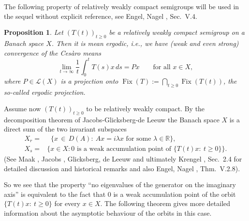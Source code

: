 \documentclass[11pt,intlimits, draft,oneside]{amsart}
\newtheorem{prop}[thm]{Proposition}
\theoremstyle{definition}
\newtheorem{defi}[thm]{Definition}
\def\Fix{\mathop{\mathrm{Fix}}}
\def\dd{\,d}
\def\clin{\mathop{\overline{\mathrm{lin}}}}
\def\LLL{\mathcal{L}}
\def\RR{\mathbb{R}}
\begin{document}
The following property of relatively weakly compact semigroups will
be used in the sequel without explicit reference, see Engel, Nagel
\cite{engel/nagel:2000}, Sec.~V.4.
%
\begin{prop} Let $(T(t))_{t\geq 0}$ be a relatively weakly compact semigroup on a Banach space $X$. Then it is \emph{mean ergodic}, i.e., we have (weak and even strong) convergence of the Ces\`{a}ro means
\begin{equation*}
\lim_{t\to\infty}\frac{1}{t}\int_0^t T(s)x\dd s = Px\qquad\mbox{for
all $x\in X$},
\end{equation*}
where $P\in \LLL(X)$ is a projection onto $\Fix (T):=\bigcap_{t\geq
0}\Fix (T(t))$, the so-called \emph{ergodic projection}.
\end{prop}


Assume now $(T(t))_{t\geq 0}$ to be relatively weakly compact. By
the decomposition theorem of Jacobs-Glicksberg-de Leeuw the Banach
space $X$ is a direct sum of the two invariant subspaces
%
\begin{align*}
X_r =& \clin \bigl\{x \,\in\, D(A):\ Ax= i\lambda x \text{ for some } \lambda \in \RR \bigr\}, \\
X_s =& \bigl\{ x \in X : 0 \text{ is a weak accumulation point of }
\{ T(t)x:\: t\geq 0 \} \bigr\}.
\end{align*}
%
(See Maak \cite{maak:1954}, Jacobs \cite{jacobs:1955}, Glicksberg,
de Leeuw \cite{glicksberg/deleeuw:1961} and ultimately Krengel
\cite{krengel:1985}, Sec.~2.4 for detailed discussion and historical
remarks and also Engel, Nagel \cite{engel/nagel:2000}, Thm.~V.2.8).

So we see that the property ``no eigenvalues of the generator on the imaginary axis'' is equivalent to the fact that  $0$ is a weak accumulation point of the orbit $\{T(t)x:\ t\geq 0\}$ for every $x\in X$. The following theorem gives more detailed information about the asymptotic behaviour of the orbits in this case.

%
%
\end{document}
